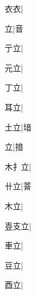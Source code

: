 \begin{multicols}{2}
{{\cjk{}{\cnsym{}　}衣衣}\mktsJzrVerticalBar{}{\cjk{}{\cnsym{}　}{\cnsym{}　}{\cnsym{}　}}|{}\par
{\cjk{}{\cnsym{}　}{\cnsym{}　}立}\mktsJzrVerticalBar{}{\cjk{}{\cnsym{}　}{\cnsym{}　}{\cnsym{}　}}|{\cjk{}音}\par
{亍立}\mktsJzrVerticalBar{}{\cjk{}{\cnsym{}　}{\cnsym{}　}{\cnsym{}　}}|{}\par
{\cjk{}{\cnsym{}　}元立}\mktsJzrVerticalBar{}{\cjk{}{\cnsym{}　}{\cnsym{}　}{\cnsym{}　}}|{}\par
{丁立}|{}\par
{\cjk{}{\cnsym{}　}耳立}\mktsJzrVerticalBar{}{\cjk{}{\cnsym{}　}{\cnsym{}　}{\cnsym{}　}}|{}\par
{\cjk{}{\cnsym{}　}土立}\mktsJzrVerticalBar{}{\cjk{}{\cnsym{}　}{\cnsym{}　}{\cnsym{}　}}|{\cjk{}堷}\par
{立}\mktsJzrVerticalBar{}{\cjk{}{\cnsym{}　}{\cnsym{}　}{\cnsym{}　}}|{\cjk{}揞}\par
{\cjk{}木{扌}立}\mktsJzrVerticalBar{}{\cjk{}{\cnsym{}　}{\cnsym{}　}{\cnsym{}　}}|{}\par
{\cjk{}{\cnsym{}　}卄立}\mktsJzrVerticalBar{}{\cjk{}{\cnsym{}　}{\cnsym{}　}{\cnsym{}　}}|{\cjk{}萻}\par
{\cjk{}{\cnsym{}　}木立}\mktsJzrVerticalBar{}{\cjk{}{\cnsym{}　}{\cnsym{}　}{\cnsym{}　}}|{}\par
{\cjk{}壴支立}\mktsJzrVerticalBar{}{\cjk{}{\cnsym{}　}{\cnsym{}　}{\cnsym{}　}}|{}\par
{\cjk{}{\cnsym{}　}車立}\mktsJzrVerticalBar{}{\cjk{}{\cnsym{}　}{\cnsym{}　}{\cnsym{}　}}|{}\par
{\cjk{}{\cnsym{}　}豆立}\mktsJzrVerticalBar{}{\cjk{}{\cnsym{}　}{\cnsym{}　}{\cnsym{}　}}|{}\par
{\cjk{}{\cnsym{}　}酉立}\mktsJzrVerticalBar{}{\cjk{}{\cnsym{}　}{\cnsym{}　}{\cnsym{}　}}|{}\par
}
\end{multicols}
